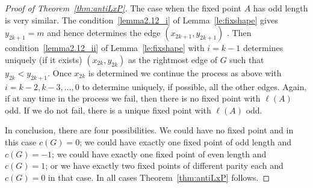 \begin{proof}[Proof of Theorem~\ref{thm:antiLxP}]
 The case when the fixed point $A$ has odd length is very similar. The condition~\ref{lemma2.12_i} of Lemma~\ref{le:fixshape} gives $y_{2k+1}=m$ and hence determines the edge $(x_{2k+1},y_{2k+1})$ . 
Then condition~\ref{lemma2.12_ii} of Lemma~\ref{le:fixshape} with $i=k-1$ determines uniquely (if it exists) $(x_{2k},y_{2k})$ as the rightmost edge of $G$ such that $y_{2k}<y_{2k+1}$. Once $x_{2k}$ is determined
we continue the process as above with $i=k-2, k-3,\ldots,0$ to determine uniquely, if possible, all the other edges. Again, if at any time in the process we fail, then there is no fixed point with $\ell(A)$ odd. If we do not fail, there is a unique fixed point with $\ell(A)$ odd.

In conclusion, there are four possibilities. We could have no fixed point and in this case $c(G)=0$; we could have exactly one fixed point of odd length and $c(G)=-1$; we could have exactly one fixed point of even length and $c(G)=1$; or we have exactly two fixed points of different parity each and $c(G)=0$ in that case. In all cases Theorem~\ref{thm:antiLxP} follows. 
\end{proof}
